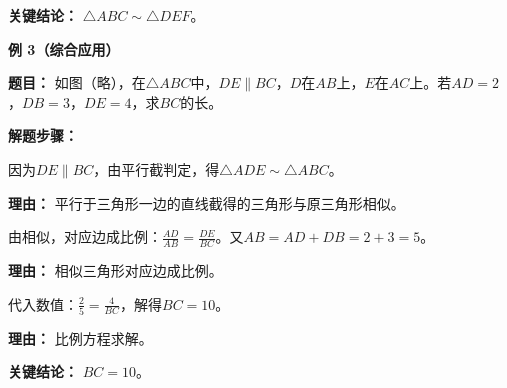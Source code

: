 \begin{examplebox}
	\textbf{\textcolor{CExample}{关键结论：}}
	$\triangle ABC \sim \triangle DEF$。

	\medskip
	\textbf{\textcolor{CExample}{例 3（综合应用）}}

	\textbf{\textcolor{CExample}{题目：}}
	如图（略），在$\triangle ABC$中，$DE\parallel BC$，$D$在$AB$上，$E$在$AC$上。若$AD=2$，$DB=3$，$DE=4$，求$BC$的长。

	\textbf{\textcolor{CExample}{解题步骤：}}
	\begin{description}[style=nextline, leftmargin=2.8em, labelsep=0.5em, itemsep=0.45em]
		\item[\textbf{第一步（证相似）：}] 因为$DE\parallel BC$，由平行截判定，得$\triangle ADE\sim\triangle ABC$。
			\par\textbf{理由：} 平行于三角形一边的直线截得的三角形与原三角形相似。
		\item[\textbf{第二步（列比例式）：}] 由相似，对应边成比例：$\frac{AD}{AB} = \frac{DE}{BC}$。又$AB = AD+DB = 2+3=5$。
			\par\textbf{理由：} 相似三角形对应边成比例。
		\item[\textbf{第三步（解方程）：}] 代入数值：$\frac{2}{5} = \frac{4}{BC}$，解得$BC=10$。
			\par\textbf{理由：} 比例方程求解。
	\end{description}

	\textbf{\textcolor{CExample}{关键结论：}}
	$BC=10$。
\end{examplebox}
